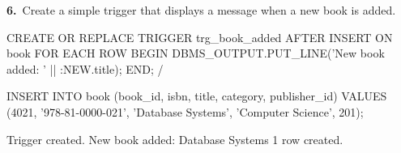 \noindent\begin{minipage}{\linewidth}
\begingroup{}
{\fontsize{14}{17}\selectfont\textbf{6.}}\ Create a simple trigger that displays a message when a new book is added.\par
\endgroup\vspace{12pt}


\begin{sqlcode}
CREATE OR REPLACE TRIGGER trg_book_added
AFTER INSERT ON book
FOR EACH ROW
BEGIN
   DBMS_OUTPUT.PUT_LINE('New book added: ' || :NEW.title);
END;
/

INSERT INTO book (book_id, isbn, title, category, publisher_id)
VALUES (4021, '978-81-0000-021', 'Database Systems',
        'Computer Science', 201);
\end{sqlcode}

\vspace{18pt}


\begin{sqlout}[fontsize=\small]
Trigger created.
New book added: Database Systems
1 row created.
\end{sqlout}
\end{minipage}\par\vspace{24pt}

